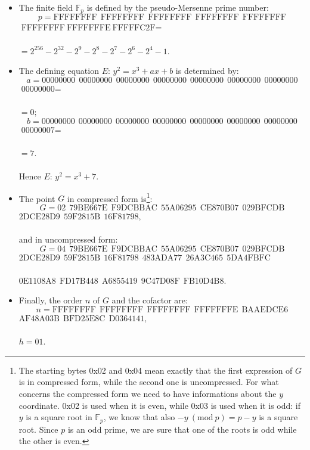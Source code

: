 \begin{itemize}
	\item The finite field $\mathbb{F}_p$ is defined by the pseudo-Mersenne prime number: 
	$$p = \text{FFFFFFFF} \ \ \text{FFFFFFFF} \ \ \text{FFFFFFFF} \ \ \text{FFFFFFFF} \ \ \text{FFFFFFFF}$$ 
	$\text{FFFFFFFF} \ \text{FFFFFFFE} \ \text{FFFFFC2F} =$
	\\
	\\
	$= 2^{256} - 2^{32} - 2^9 - 2^8 - 2^7 - 2^6 - 2^4 - 1.$
	\item The defining equation $E$: $y^2 = x^3 + ax + b$ is determined by:
	$$a = \text{00000000} \ \ \text{00000000} \ \ \text{00000000} \ \ \text{00000000} \ \ \text{00000000} \ \ \text{00000000} \ \ \text{00000000}$$
	$ \text{00000000} =$
	\\
	\\
	$= 0;$
	$$b = \text{00000000} \ \ \text{00000000} \ \ \text{00000000} \ \ \text{00000000} \ \ \text{00000000} \ \ \text{00000000} \ \ \text{00000000}$$
	$ \text{00000007} =$
	\\
	\\
	$= 7.$
	\\
	\\
	Hence $E$:	$y^2 = x^3 + 7$.
	\item The point $G$ in compressed form is\footnote{The starting bytes 0x02 and 0x04 mean exactly that the first expression of $G$ is in compressed form, while the second one is uncompressed. For what concerns the compressed form we need to have informations about the $y$ coordinate. 0x02 is used when it is even, while 0x03 is used when it is odd: if $y$ is a square root in $\mathbb{F}_p$, we know that also $-y \ (\text{mod} \ p) = p - y$ is a square root. Since $p$ is an odd prime, we are sure that one of the roots is odd while the other is even.}:
	$$G = \text{02} \ \ \text{79BE667E} \ \ \text{F9DCBBAC} \ \ \text{55A06295} \ \ \text{CE870B07} \ \ \text{029BFCDB}$$ 
	$\text{2DCE28D9} \ \ \text{59F2815B} \ \ \text{16F81798},$
	\\
	\\
	and in uncompressed form:
	$$G = \text{04} \ \ \text{79BE667E} \ \ \text{F9DCBBAC} \ \ \text{55A06295} \ \ \text{CE870B07} \ \ \text{029BFCDB}$$ 
	$\text{2DCE28D9} \ \ \text{59F2815B} \ \ \text{16F81798} \ \ \text{483ADA77} \ \ \text{26A3C465} \ \ \text{5DA4FBFC}$
	\\
	\\
	$\text{0E1108A8} \ \ \text{FD17B448} \ \ \text{A6855419} \ \ \text{9C47D08F} \ \ \text{FB10D4B8}$.
	\item Finally, the order $n$ of $G$ and the cofactor are:
	$$n = \text{FFFFFFFF} \ \ \text{FFFFFFFF} \ \ \text{FFFFFFFF} \ \ \text{FFFFFFFE} \ \ \text{BAAEDCE6}$$
	$\text{AF48A03B} \ \ \text{BFD25E8C} \ \ \text{D0364141},$
	\\
	\\
	$h = \text{01}$.
\end{itemize}

